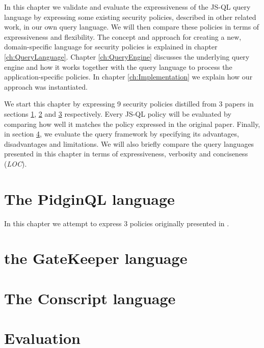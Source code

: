 In this chapter we validate and evaluate the expressiveness of the JS-QL query language by expressing some existing security policies, described in other related work, in our own query language. We will then compare these policies in terms of expressiveness and flexibility. %
The concept and approach for creating a new, domain-specific language for security policies is explained in chapter \ref{ch:QueryLanguage}. Chapter \ref{ch:QueryEngine} discusses the underlying query engine and how it works together with the query language to process the application-specific policies. In chapter \ref{ch:Implementation} we explain how our approach was instantiated.

We start this chapter by expressing 9 security policies distilled from 3 papers in sections \ref{sec:ValidationPidginQL}, \ref{sec:ValidationGK} and \ref{sec:ValidationConscript} respectively. Every JS-QL policy will be evaluated by comparing how well it matches the policy expressed in the original paper. Finally, in section \ref{sec:ValidationEvaluation}, we evaluate the query framework by specifying its advantages, disadvantages and limitations. We will also briefly compare the query languages presented in this chapter in terms of expressiveness, verbosity and conciseness (\textit{LOC}).

\section{The PidginQL language}
\label{sec:ValidationPidginQL}

In this chapter we attempt to express 3 policies originally presented in \cite{PidginQLTechReport}.

\subsection{}
\subsection{}
\subsection{}

\section{the GateKeeper language}
\label{sec:ValidationGK}

\section{The Conscript language}
\label{sec:ValidationConscript}

\section{Evaluation}
\label{sec:ValidationEvaluation}
